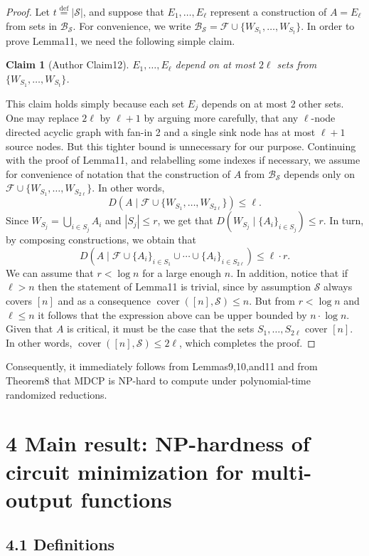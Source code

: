 \documentclass[10pt,a4paper]{article}
\newtheorem{ntclaim}[nttheorem]{Claim}
\begin{document}
\begin{proof}
Let $t\stackrel{\mathrm{def}}=|\mathcal S|$, and suppose that $E_1,\ldots,E_\ell$ represent a construction of $A=E_\ell$ from sets in $\mathcal B_{\mathcal S}$. For convenience, we write $\mathcal B_{\mathcal S}=\mathcal F\cup\{W_{S_1},\ldots,W_{S_t}\}$. In order to prove Lemma11, we need the following simple claim.
\begin{ntclaim}[Author Claim12]
$E_1,\ldots,E_\ell$ depend on at most $2\ell$ sets from $\{W_{S_1},\ldots,W_{S_t}\}$.
\end{ntclaim}
This claim holds simply because each set $E_j$ depends on at most 2 other sets. One may replace $2\ell$ by $\ell+1$ by arguing more carefully, that any $\ell$-node directed acyclic graph with fan-in 2 and a single sink node has at most $\ell+1$ source nodes. But this tighter bound is unnecessary for our purpose.
Continuing with the proof of Lemma11, and relabelling some indexes if necessary, we assume for convenience of notation that the construction of $A$ from $\mathcal B_{\mathcal S}$ depends only on $\mathcal F\cup\{W_{S_1},\ldots,W_{S_{2\ell}}\}$. In other words,
\[D(A\mid\mathcal F\cup\{W_{S_1},\ldots,W_{S_{2\ell}}\})\leq\ell.\]
Since $W_{S_j}=\bigcup_{i\in S_j}A_i$ and $|S_j|\leq r$, we get that $D(W_{S_j}\mid\{A_i\}_{i\in S_j})\leq r$. In turn, by composing constructions, we obtain that
\[D(A\mid\mathcal F\cup\{A_i\}_{i\in S_1}\cup\cdots\cup\{A_i\}_{i\in S_{2\ell}})\leq\ell\cdot r.\]
We can assume that $r<\log n$ for a large enough $n$. In addition, notice that if $\ell>n$ then the statement of Lemma11 is trivial, since by assumption $\mathcal S$ always covers $[n]$ and as a consequence $\operatorname{cover}([n],\mathcal S)\leq n$. But from $r<\log n$ and $\ell\leq n$ it follows that the expression above can be upper bounded by $n\cdot\log n$. Given that $A$ is critical, it must be the case that the sets $S_1,\ldots,S_{2\ell}$ cover $[n]$. In other words, $\operatorname{cover}([n],\mathcal S)\leq2\ell$, which completes the proof.
\end{proof}
Consequently, it immediately follows from Lemmas9,10,and11 and from Theorem8 that MDCP is NP-hard to compute under polynomial-time randomized reductions.

\section*{4 Main result: NP-hardness of circuit minimization for multi-output functions}
\subsection*{4.1 Definitions}
\end{document}
